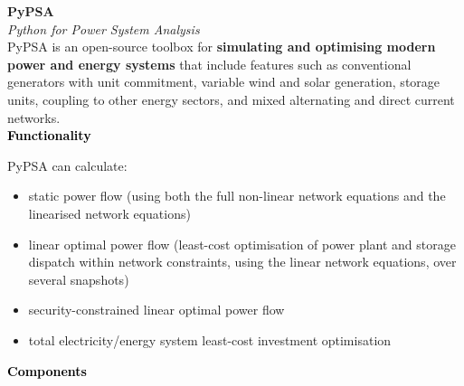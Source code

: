 \documentclass[a0,portrait]{a0poster}
\begin{document}
\vspace{17em}




\begin{multicols}{3}
\raggedcolumns

\noindent \textcolor{red100}{\huge \textbf{PyPSA}}
\\
\textit{Python for Power System Analysis}
\\

\noindent
PyPSA is an open-source toolbox for \textbf{simulating and optimising modern power and energy 
systems} that include features such as conventional generators with unit commitment, 
variable wind and solar generation, storage units, coupling to other energy sectors, 
and mixed alternating and direct current networks. \\

\noindent \textcolor{black}{\large \textbf{Functionality}}

\noindent PyPSA can calculate:

\begin{itemize}
    \item static power flow (using both the full non-linear network equations and the linearised network equations)
    \item linear optimal power flow (least-cost optimisation of power plant and storage dispatch within network constraints, using the linear network equations, over several snapshots)
    \item security-constrained linear optimal power flow
    \item total electricity/energy system least-cost investment optimisation
\end{itemize}


\noindent \textcolor{black}{\large \textbf{Components}}


\end{multicols}
\end{document}
